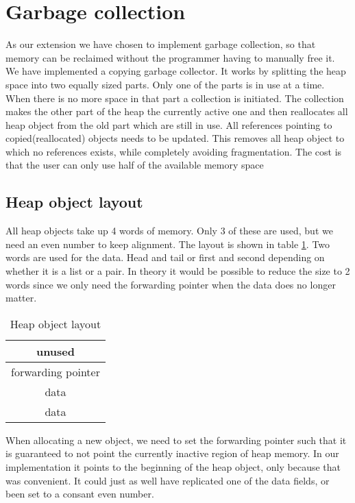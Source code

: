 \documentclass{scrartcl}
\begin{document}
\section{Garbage collection}
\label{sec:gc}
As our extension we have chosen to implement garbage collection, so that
memory can be reclaimed without the programmer having to manually free
it. We have implemented a copying garbage collector. It works by splitting 
the heap space into two equally sized parts. Only one of the parts is 
in use at a time. When there is no more space in that part a collection
is initiated. The collection makes the other part of the heap the 
currently active one and then reallocates all heap object from the old
part which are still in use. All references pointing to copied(reallocated)
objects needs to be updated. This removes all heap object to which no
references exists, while completely avoiding fragmentation. The cost is
that the user can only use half of the available memory space 

\subsection{Heap object layout}
\label{sec:gc:heap}
All heap objects take up 4 words of memory. Only 3 of these are used,
but we need an even number to keep alignment. The layout is shown
in table \ref{tab:heapobj}. Two words are used for the data. Head and 
tail or first and second depending on whether it is a list or a 
pair. In theory it would be
possible to reduce the size to 2 words since we only need the forwarding
pointer when the data does no longer matter.

\begin{table}
\centering
\begin{tabular}{| c |}
\hline
unused \\
\hline
forwarding pointer \\
\hline
data \\
\hline
data \\
\hline
\end{tabular}
\caption{Heap object layout}
\label{tab:heapobj}
\end{table}

When allocating a new object, we need to set the forwarding pointer
such that it is guaranteed to not point the currently inactive
region of heap memory. In our implementation it points to the beginning
of the heap object, only because that was convenient. It could just
as well have replicated one of the data fields, or been set to a consant
even number.
\end{document}
